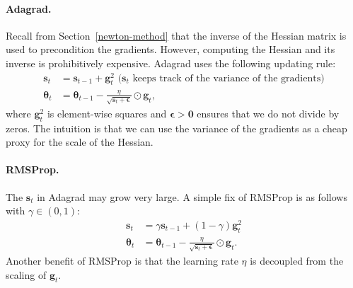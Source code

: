            \paragraph{Adagrad.} 
            Recall from Section~\ref{newton-method} that the inverse of the Hessian matrix is used to precondition the gradients. 
            However, computing the Hessian and its inverse is prohibitively expensive. 
            Adagrad uses the following updating rule:
                \begin{equation}
                    \begin{aligned}
                        \bm{s}_t & = \bm{s}_{t-1} + \bm{g}_t^2  \text{ ($\bm{s}_t$ keeps track of the variance of the gradients)}\\
                        \bm{\theta}_t & = \bm{\theta}_{t-1} - \frac{\eta}{\sqrt{\bm{s}_t + \bm{\epsilon}}} \odot \bm{g}_t,
                    \end{aligned}
                \end{equation}
            where $\bm{g}_t^2$ is element-wise squares and $\bm{\epsilon} > \bm{0}$ ensures that we do not divide by zeros.
            The intuition is that we can use the variance of the gradients as a cheap proxy for the scale of the Hessian. 

            \paragraph{RMSProp.} 
            The $\bm{s}_t$ in Adagrad may grow very large. A simple fix of RMSProp is as follows with $\gamma \in (0, 1)$:
                \begin{equation}
                    \begin{aligned}
                        \bm{s}_t & = \gamma \bm{s}_{t-1} + (1 - \gamma) \bm{g}_t^2  \\
                        \bm{\theta}_t & = \bm{\theta}_{t-1} - \frac{\eta}{\sqrt{\bm{s}_t + \bm{\epsilon}}} \odot \bm{g}_t.
                    \end{aligned}
                \end{equation}
            Another benefit of RMSProp is that the learning rate $\eta$ is decoupled from the scaling of $\bm{g}_t$.



